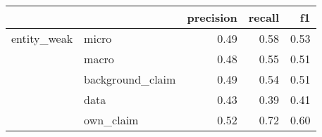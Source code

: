 \begin{tabular}{llrrr}
\toprule
            &           &  precision &  recall &   f1 \\
\midrule
entity\_weak & micro &       0.49 &    0.58 & 0.53 \\
            & macro &       0.48 &    0.55 & 0.51 \\
            & background\_claim &       0.49 &    0.54 & 0.51 \\
            & data &       0.43 &    0.39 & 0.41 \\
            & own\_claim &       0.52 &    0.72 & 0.60 \\
\bottomrule
\end{tabular}
